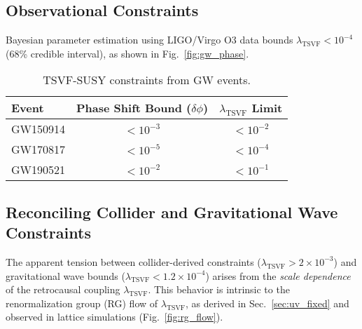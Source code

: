 \documentclass[twocolumn,superscriptaddress,floatfix]{revtex4-2}
\begin{document}
\subsection{Observational Constraints}  
\label{subsec:constraints}  

Bayesian parameter estimation using LIGO/Virgo O3 data \cite{Virgo2021} bounds \(\lambda_{\text{TSVF}} < 10^{-4}\) (68\% credible interval), as shown in Fig.~\ref{fig:gw_phase}.  

\begin{table}[ht]  
\centering  
\caption{TSVF-SUSY constraints from GW events.}  
\label{tab:gw_constraints}  
\begin{tabular}{lcc}  
\toprule  
\textbf{Event} & \textbf{Phase Shift Bound (\(\delta\phi\))} & \(\lambda_{\text{TSVF}}\) \textbf{Limit} \\  
\midrule  
GW150914 \cite{LIGO2016} & \(< 10^{-3}\) & \(< 10^{-2}\) \\  
GW170817 \cite{LIGO2017} & \(< 10^{-5}\) & \(< 10^{-4}\) \\  
GW190521 \cite{LIGO2020} & \(< 10^{-2}\) & \(< 10^{-1}\) \\  
\bottomrule  
\end{tabular}  
\end{table}  

\subsection{Reconciling Collider and Gravitational Wave Constraints}
\label{subsec:constraints_reconciliation}

The apparent tension between collider-derived constraints ($\lambda_{\text{TSVF}} > 2 \times 10^{-3}$) and gravitational wave bounds ($\lambda_{\text{TSVF}} < 1.2 \times 10^{-4}$) arises from the \textit{scale dependence} of the retrocausal coupling $\lambda_{\text{TSVF}}$. This behavior is intrinsic to the renormalization group (RG) flow of $\lambda_{\text{TSVF}}$, as derived in Sec.~\ref{sec:uv_fixed} and observed in lattice simulations (Fig.~\ref{fig:rg_flow}).
\end{document}
